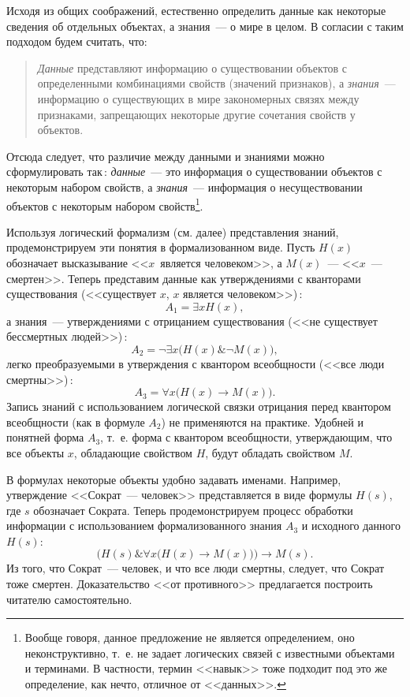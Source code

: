 \documentclass[a4paper,14pt, openany, twoside, draft]{extbook} %
\begin{document}
Исходя из общих соображений, естественно определить данные как некоторые сведения об отдельных объектах, а знания~--- о мире в целом. В согласии с таким подходом будем считать, что:
\begin{quote}
{\em Данные} представляют информацию о существовании объектов с определенными комбинациями свойств (значений признаков), а {\em знания}~--- информацию о существующих в мире закономерных связях между признаками, запрещающих некоторые другие сочетания свойств у объектов.
\end{quote}

Отсюда следует, что различие между данными и знаниями можно сформулировать так\,: {\em данные}~--- это информация о существовании объектов с некоторым набором свойств, а {\em знания}~--- информация о несуществовании объектов с некоторым набором свойств\footnote{Вообще говоря, данное предложение не является определением, оно неконструктивно, т.~е. не задает логических связей с известными объектами и терминами. В частности, термин <<навык>> тоже подходит под это же определение, как нечто, отличное от <<данных>>.}.

Используя логический формализм (см. далее) представления знаний, продемонстрируем эти понятия в формализованном виде.  Пусть $H(x)$ обозначает высказывание <<$x$~является человеком>>, а $M(x)$~--- <<$x$~--- смертен>>. Теперь представим данные как утверждениями с кванторами существования (<<существует $x$, $x$ является человеком>>)\,:
$$
    A_1=\exists x H(x),
$$
а знания~--- утверждениями с отрицанием существования (<<не существует бессмертных людей>>)\,:
$$
    A_2=\neg\exists x \big ( H(x) \& \neg M(x) \big ),
$$
легко преобразуемыми в утверждения с квантором всеобщности (<<все люди смертны>>)\,:
$$
    A_3=\forall x \big ( H(x)\to M(x)\big ).
$$
Запись знаний с использованием логической связки отрицания перед квантором всеобщности (как в формуле $A_2$) не применяются на практике. Удобней и понятней форма $A_3$, т.~е. форма с квантором всеобщности, утверждающим, что все объекты $x$, обладающие свойством $H$, будут обладать свойством $M$.

В формулах некоторые объекты удобно задавать именами.  Например, утверждение <<Сократ~--- человек>> представляется в виде формулы $H(s)$, где $s$ обозначает Сократа.  Теперь продемонстрируем процесс обработки информации с использованием формализованного знания $A_3$ и исходного данного $H(s)$:
$$
\Big (H(s) \& \forall x \big ( H(x)\to M(x)\big ) \Big ) \to M(s).
$$
Из того, что Сократ~--- человек, и что все люди смертны, следует, что Сократ тоже смертен.  Доказательство <<от противного>> предлагается построить читателю самостоятельно.
\end{document}

